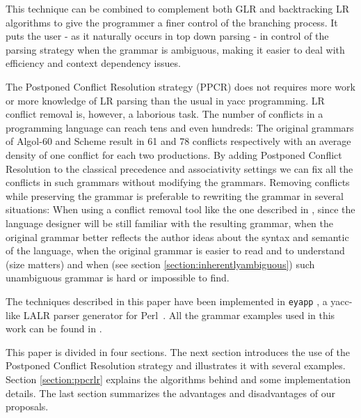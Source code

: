 This technique can be combined to complement both GLR and backtracking LR
\mbox{algorithms} to give the programmer a finer control of the branching process.
It puts the user - as it naturally occurs in top down parsing - 
in control of the parsing strategy when the grammar is ambiguous,
making it easier to deal with efficiency and context dependency issues.

The Postponed Conflict Resolution  strategy (PPCR) does not 
requires more work or more knowledge of LR parsing
than the usual in yacc programming.
LR conflict removal is, however,  a laborious task.
The number of conflicts in a programming language can reach tens and even hundreds:
The original grammars of Algol-60 and Scheme
result in 61 and  78 conflicts respectively with 
an average density of one conflict for each two productions.
By adding Postponed Conflict Resolution to the classical  precedence and associativity 
settings we can fix all the conflicts in such grammars without modifying the grammars.
Removing conflicts while preserving the grammar is preferable to rewriting the grammar in 
several situations: 
When using a  conflict removal tool like the one described in
\cite{passos}, since the language designer will be still familiar with the resulting grammar,
when the original grammar better reflects  the author ideas about the syntax and semantic of the language,
when the original grammar is easier to read and to understand (size matters)
and when (see section \ref{section:inherentlyambiguous}) such unambiguous grammar is hard or impossible to find.


The techniques described in this paper have been implemented in 
\verb|eyapp| \cite{Rodriguez:Leon},
a yacc-like LALR parser generator for \mbox{Perl \cite{Wall:Perl}}. 
All the grammar examples used in this work can be found in \cite{lgforte}.



This paper is divided in four sections.
The next section introduces the use of the Postponed Conflict Resolution
strategy and 
illustrates it with several examples.
Section \ref{section:ppcrlr} explains the algorithms behind and 
some implementation details.
The last section 
summarizes the advantages and disadvantages of our proposals.
%
%

